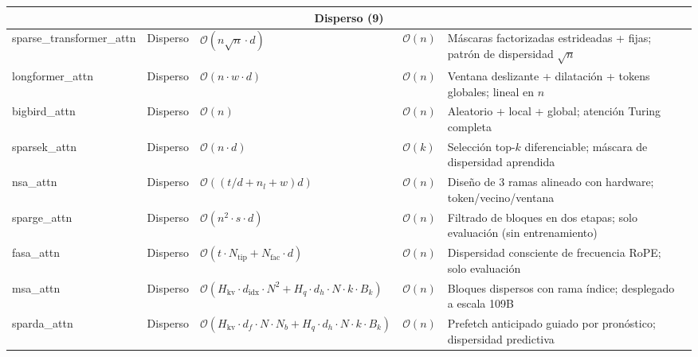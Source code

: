 \begin{longtable}{p{2.0cm}p{1.3cm}p{2.2cm}p{2.2cm}p{4.0cm}p{2.5cm}}
\multicolumn{6}{c}{\textbf{Disperso (9)}} \\
\midrule
sparse\_transformer\_attn & Disperso & $\mathcal{O}(n \sqrt{n} \cdot d)$ & $\mathcal{O}(n)$ & Máscaras factorizadas estrideadas + fijas; patrón de dispersidad $\sqrt{n}$ & \citep{child_sparse_transformer_2019} \\
longformer\_attn & Disperso & $\mathcal{O}(n \cdot w \cdot d)$ & $\mathcal{O}(n)$ & Ventana deslizante + dilatación + tokens globales; lineal en $n$ & \citep{beltagy_longformer_2020} \\
bigbird\_attn & Disperso & $\mathcal{O}(n)$ & $\mathcal{O}(n)$ & Aleatorio + local + global; atención Turing completa & \citep{zaheer_bigbird_2020} \\
sparsek\_attn & Disperso & $\mathcal{O}(n \cdot d)$ & $\mathcal{O}(k)$ & Selección top-$k$ diferenciable; máscara de dispersidad aprendida & \citep{lou_sparsek_2024} \\
nsa\_attn & Disperso & $\mathcal{O}((t/d + n_l + w)d)$ & $\mathcal{O}(n)$ & Diseño de 3 ramas alineado con hardware; token/vecino/ventana & \citep{yuan_nsa_2025} \\
sparge\_attn & Disperso & $\mathcal{O}(n^2 \cdot s \cdot d)$ & $\mathcal{O}(n)$ & Filtrado de bloques en dos etapas; solo evaluación (sin entrenamiento) & \citep{zhang_spargeattn_2025} \\
fasa\_attn & Disperso & $\mathcal{O}(t \cdot N_{\text{tip}} + N_{\text{fac}} \cdot d)$ & $\mathcal{O}(n)$ & Dispersidad consciente de frecuencia RoPE; solo evaluación & \citep{wang_fasa_2026} \\
msa\_attn & Disperso & $\mathcal{O}(H_{\text{kv}} \cdot d_{\text{idx}} \cdot N^2 + H_q \cdot d_h \cdot N \cdot k \cdot B_k)$ & $\mathcal{O}(n)$ & Bloques dispersos con rama índice; desplegado a escala 109B & \citep{lai_minimax_2026} \\
sparda\_attn & Disperso & $\mathcal{O}(H_{\text{kv}} \cdot d_f \cdot N \cdot N_b + H_q \cdot d_h \cdot N \cdot k \cdot B_k)$ & $\mathcal{O}(n)$ & Prefetch anticipado guiado por pronóstico; dispersidad predictiva & \citep{fu_sparda_2026} \\
\midrule


\end{longtable}
